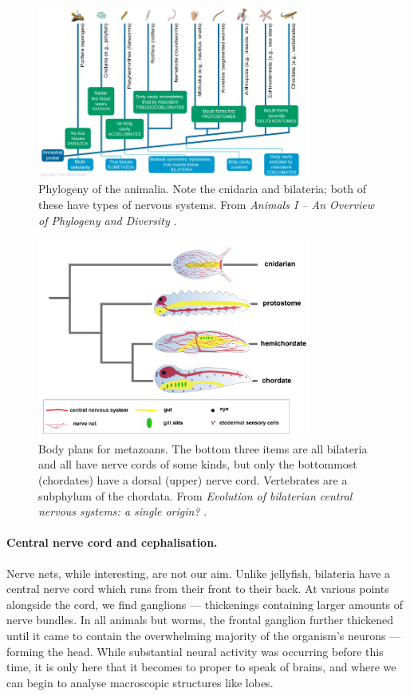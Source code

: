 \begin{figure}
	\centering
	\includegraphics[width=0.8\textwidth]{Figs/animalia.jpg}
	\caption{Phylogeny of the animalia. Note the cnidaria and bilateria; both of these have types of nervous systems. From {\em Animals I -- An Overview of Phylogeny and Diversity} \cite{animalia}.}
	\label{fig:animalia}
\end{figure}

\begin{figure}
	\centering
	\includegraphics[width=0.8\textwidth]{Figs/chordata.jpg}
	\caption{Body plans for metazoans. The bottom three items are all bilateria and all have nerve cords of some kinds, but only the bottommost (chordates) have a dorsal (upper) nerve cord. Vertebrates are a subphylum of the chordata. From {\em Evolution of bilaterian central nervous systems: a single origin?} \cite[p.\ 3]{chordata}.}
	\label{fig:chordata}
\end{figure}

\paragraph{Central nerve cord and cephalisation.} Nerve nets, while interesting, are not our aim. Unlike jellyfish, bilateria have a central nerve cord which runs from their front to their back. At various points alongside the cord, we find ganglions --- thickenings containing larger amounts of nerve bundles. In all animals but worms, the frontal ganglion further thickened until it came to contain the overwhelming majority of the organism's neurons --- forming the head. While substantial neural activity was occurring before this time, it is only here that it becomes to proper to speak of brains, and where we can begin to analyse macroscopic structures like lobes.

